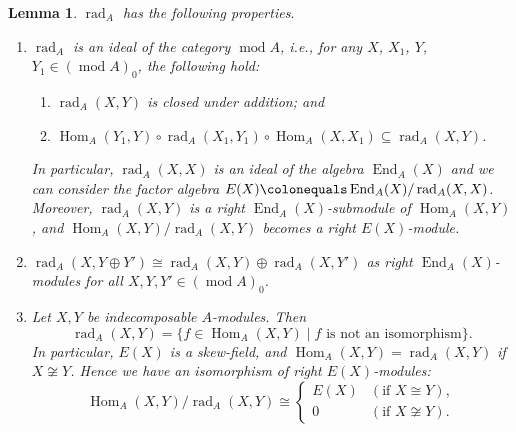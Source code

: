 \documentclass{surv-l}
\numberwithin{equation}{chapter}
\numberwithin{figure}{chapter}
\theoremstyle{plain}
\newtheorem{lem}[thm]{Lemma}
\theoremstyle{definition}
\theoremstyle{remark}
\DeclareMathOperator{\Hom}{Hom}
\DeclareMathOperator{\rad}{rad}
\DeclareMathOperator{\End}{End}
\begin{document}
\begin{lem}\label{lem:rad-delta}
$\rad_A$ has the following properties.
\begin{enumerate}
\item
$\rad_A$ is an ideal of the category $\operatorname{mod} A$, i.e.,
for any $X$, $X_1$, $Y$, $Y_1 \in (\operatorname{mod} A)_0$, the following hold:
\begin{enumerate}
\item
$\rad_A(X, Y)$ is closed under addition; and
\item
$\Hom_A(Y_1,Y) \circ \rad_A(X_1,Y_1) \circ \Hom_A(X,X_1) \subseteq \rad_A(X, Y)$.
\end{enumerate}
In particular, $\rad_A(X, X)$ is an ideal of the algebra $\End_A(X)$ and we can consider
the factor algebra $E(X)\colonequals  \End_A(X)/\rad_A(X, X)$.
Moreover, $\rad_A(X, Y)$ is a right $\End_A(X)$-submodule of $\Hom_A(X, Y)$, and
$\Hom_A(X, Y)/\rad_A(X,Y)$ becomes a right $E(X)$-module.
\item
$\rad_A(X, Y \oplus Y') \cong \rad_A(X, Y) \oplus \rad_A(X, Y')$ as right $\End_A(X)$-modules
for all $X, Y, Y' \in (\operatorname{mod} A)_0$.
\item
Let $X, Y$ be indecomposable $A$-modules.
Then
\[
\rad_A(X, Y) = \{f \in \Hom_A(X, Y) \mid f \text{ is not an isomorphism}\}.
\]
In particular, $E(X)$ is a skew-field, and $\Hom_A(X, Y) = \rad_A(X, Y)$ if $X \not\cong Y$.
Hence we have an isomorphism of right $E(X)$-modules:
\begin{equation}\label{eq:delta-iso-noniso}
\Hom_A(X, Y)/\rad_A(X, Y) \cong
\begin{cases}
E(X) & (\text{if }X \cong Y),\\
0 & (\text{if }X \not\cong Y).
\end{cases}
\end{equation}

\end{enumerate}
\end{lem}
\end{document}

